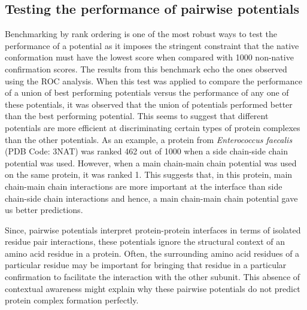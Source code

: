 \subsection{Testing the performance of pairwise potentials}
Benchmarking by rank ordering is one of the most robust ways to test the performance of a potential as it imposes the stringent constraint that the native conformation must have the lowest score when compared with 1000 non-native confirmation scores. The results from this benchmark echo the ones observed using the ROC analysis. When this test was applied to compare the performance of a union of best performing potentials versus the performance of any one of these potentials, it was observed that the union of potentials performed better than the best performing potential. This seems to suggest that different potentials are more efficient at discriminating certain types of protein complexes than the other potentials. As an example, a protein from \textit{Enterococcus faecalis} (PDB Code: 3NAT) was ranked 462 out of 1000 when a side chain-side chain potential was used. However, when a main chain-main chain potential was used on the same protein, it was ranked 1. This suggests that, in this protein, main chain-main chain interactions are more important at the interface than side chain-side chain interactions and hence, a main chain-main chain potential gave us better predictions.
\par

\par
Since, pairwise potentials interpret protein-protein interfaces in terms of isolated residue pair interactions, these potentials ignore the structural context of an amino acid residue in a protein. Often, the surrounding amino acid residues of a particular residue may be important for bringing that residue in a particular confirmation to facilitate the interaction with the other subunit. 
This absence of contextual awareness might explain why these pairwise potentials do not predict protein complex formation perfectly. 

